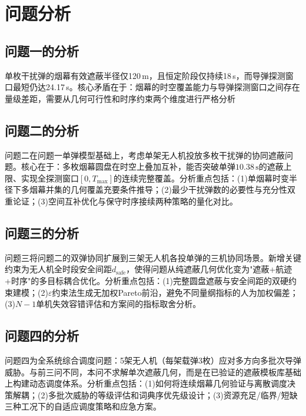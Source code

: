 \documentclass[withoutpreface,bwprint]{cumcmthesis}
\begin{document}
\section{问题分析}
\subsection{问题一的分析}

单枚干扰弹的烟幕有效遮蔽半径仅120\,m，且恒定阶段仅持续18\,s，而导弹探测窗口最短仍达24.17\,s。核心矛盾在于：烟幕的时空覆盖能力与导弹探测窗口之间存在量级差距，需要从几何可行性和时序约束两个维度进行严格分析

\subsection{问题二的分析}

问题二在问题一单弹模型基础上，考虑单架无人机投放多枚干扰弹的协同遮蔽问题。核心在于：多枚烟幕圆盘在时空上叠加互补，能否突破单弹$10.38\,\text{s}$的遮蔽上限、实现全探测窗口$[0,T_{\max}]$的连续完整覆盖。分析重点包括：(1)单烟幕时变半径下多烟幕并集的几何覆盖充要条件推导；(2)最少干扰弹数的必要性与充分性双重论证；(3)空间互补优化与保守时序接续两种策略的量化对比。

\subsection{问题三的分析}

问题三将问题二的双弹协同扩展到三架无人机各投单弹的三机协同场景。新增关键约束为无人机全时段安全间距$d_{\text{safe}}$，使得问题从纯遮蔽几何优化变为"遮蔽+航迹+时序"的多目标耦合优化。分析重点包括：(1)完整圆盘遮蔽与安全间距的双硬约束建模；(2)$\varepsilon$约束法生成无加权Pareto前沿，避免不同量纲指标的人为加权偏差；(3)$N-1$单机失效容错评估和方案间的指标取舍分析。

\subsection{问题四的分析}

问题四为全系统综合调度问题：5架无人机（每架载弹3枚）应对多方向多批次导弹威胁。与前三问不同，本问不求解单次遮蔽几何，而是在已验证的遮蔽模板库基础上构建动态调度体系。分析重点包括：(1)如何将连续烟幕几何验证与离散调度决策解耦；(2)多批次威胁的等级评估和词典序优先级设计；(3)资源充足/临界/短缺三种工况下的自适应调度策略和应急方案。


\newpage
\end{document}
